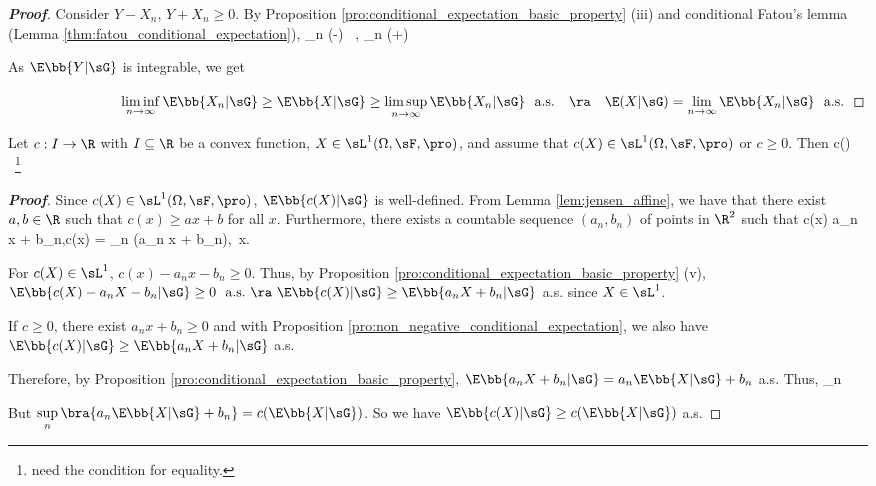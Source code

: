 \begin{proof}[\bf Proof]
Consider $Y - X_n$, $Y + X_n \geq 0$. By Proposition \ref{pro:conditional_expectation_basic_property} (iii) and conditional Fatou's lemma (Lemma \ref{thm:fatou_conditional_expectation}),
\be
\E{} \leq \liminf_{n\to \infty} (\E{}-\E{}) \ ,\quad\quad \E{} \leq \liminf_{n\to \infty} (\E{}+\E{}) \ 
\ee

As $\E\bb{Y |\sG}$ is integrable, we get
\vspace{2mm}

$\qquad\qquad\qquad\qquad\liminf\limits_{n\to \infty} \E\bb{X_n | \sG} \geq \E\bb{X | \sG} \geq \limsup\limits_{n\to \infty} \E\bb{X_n | \sG} \ \text{ a.s.}\quad \ra\quad \E(X|\sG) = \lim\limits_{n\to \infty} \E\bb{X_n | \sG}\ \text{ a.s.}$
\end{proof}

\begin{theorem}\label{thm:jensen_inequality_conditional_expectation}
Let $c : I \to \R$ with $I\subseteq \R$ be a convex function, $X \in \sL^1(\Omega,\sF,\pro)$, and assume that $c(X) \in \sL^1(\Omega,\sF,\pro)$ or $c\geq 0$. Then
\be
c(\E{}) \leq \E{}\ \footnote{need the condition for equality.}
\ee
\end{theorem}

\begin{proof}[\bf Proof]
Since $c(X)\in \sL^1(\Omega,\sF,\pro)$, $\E\bb{c(X) | \sG}$ is well-defined. From Lemma \ref{lem:jensen_affine}, we have that there exist $a,b\in \R$ such that $c(x) \geq ax + b$ for all $x$. Furthermore, there exists a countable sequence $(a_n,b_n)$ of points in $\R^2$ such that
\be
c(x) \geq a_n x + b_n,\quad\quad c(x) = \sup_n (a_n x + b_n),\ x\in \R.
\ee

For $c(X)\in \sL^1$, $c(x) - a_n x - b_n\geq 0$. Thus, by Proposition \ref{pro:conditional_expectation_basic_property} (v), $\E\bb{c(X)-a_nX -b_n|\sG} \geq 0 \ \text{ a.s.}\ \ra\ \E\bb{c(X)|\sG} \geq \E\bb{a_nX+b_n|\sG}$ a.s. since $X\in \sL^1$.

If $c\geq 0$, there exist $a_n x + b_n \geq 0$ and with Proposition \ref{pro:non_negative_conditional_expectation}, we also have $\E\bb{c(X)|\sG} \geq \E\bb{a_nX+b_n|\sG}$ a.s.

Therefore, by Proposition \ref{pro:conditional_expectation_basic_property}, $\E\bb{a_nX+b_n|\sG} = a_n\E\bb{X|\sG}+b_n$ a.s. Thus,
\be
\E{} \geq \sup_n \ 
\ee

But $\sup\limits_n\bra{ a_n\E\bb{X|\sG}+b_n} = c(\E\bb{X|\sG})$. So we have $\E\bb{c(X)|\sG} \geq c(\E\bb{X|\sG})$ a.s.
\end{proof}

